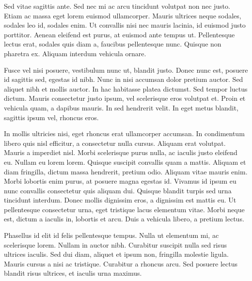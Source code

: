 \documentclass[12pt, a4paper]{article}
\begin{document}
Sed vitae sagittis ante. Sed nec mi ac arcu tincidunt volutpat non nec justo. Etiam ac massa eget lorem euismod ullamcorper. Mauris ultrices neque sodales, sodales leo id, sodales enim. Ut convallis nisi nec mauris lacinia, id euismod justo porttitor. Aenean eleifend est purus, at euismod ante tempus ut. Pellentesque lectus erat, sodales quis diam a, faucibus pellentesque nunc. Quisque non pharetra ex. Aliquam interdum vehicula ornare.

Fusce vel nisi posuere, vestibulum nunc ut, blandit justo. Donec nunc est, posuere id sagittis sed, egestas id nibh. Nunc in nisi accumsan dolor pretium auctor. Sed aliquet nibh et mollis auctor. In hac habitasse platea dictumst. Sed tempor luctus dictum. Mauris consectetur justo ipsum, vel scelerisque eros volutpat et. Proin et vehicula quam, a dapibus mauris. In sed hendrerit velit. In eget metus blandit, sagittis ipsum vel, rhoncus eros.

In mollis ultricies nisi, eget rhoncus erat ullamcorper accumsan. In condimentum libero quis nisl efficitur, a consectetur nulla cursus. Aliquam erat volutpat. Mauris a imperdiet nisl. Morbi scelerisque purus nulla, ac iaculis justo eleifend eu. Nullam eu lorem lorem. Quisque suscipit convallis quam a mattis. Aliquam et diam fringilla, dictum massa hendrerit, pretium odio. Aliquam vitae mauris enim. Morbi lobortis enim purus, at posuere magna egestas id. Vivamus id ipsum eu nunc convallis consectetur quis aliquam dui. Quisque blandit turpis sed urna tincidunt interdum. Donec mollis dignissim eros, a dignissim est mattis eu. Ut pellentesque consectetur urna, eget tristique lacus elementum vitae. Morbi neque est, dictum a iaculis in, lobortis et arcu. Duis a vehicula libero, a pretium lectus.

Phasellus id elit id felis pellentesque tempus. Nulla ut elementum mi, ac scelerisque lorem. Nullam in auctor nibh. Curabitur suscipit nulla sed risus ultrices iaculis. Sed dui diam, aliquet et ipsum non, fringilla molestie ligula. Mauris cursus a nisi ac tristique. Curabitur a rhoncus arcu. Sed posuere lectus blandit risus ultrices, et iaculis urna maximus.
\end{document}
